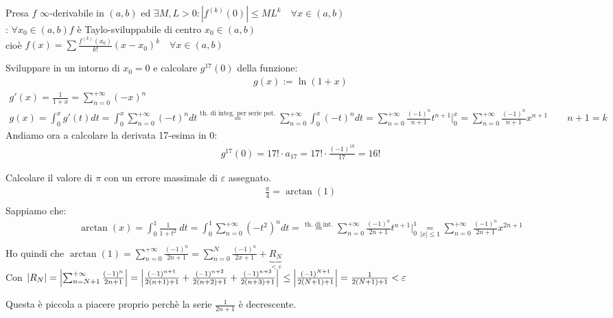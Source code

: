 \documentclass[a4paper, oneside]{article}
\begin{document}
\begin{theorem}
  Presa $f$ $\infty$-derivabile in $(a,b)$ ed $\exists M,L > 0: |f^{(k)}(0)| \leq M L^k \quad \forall x \in (a,b)$\\
  : $\forall x_0 \in (a,b) f$ è Taylo-sviluppabile di centro $x_0 \in (a,b)$\\
  cioè $f(x) = \sum \frac{f^{(k)}(x_0)}{k!} (x-x_0)^k \quad \forall x \in (a,b)$
\end{theorem}
\begin{example}
  Sviluppare in un intorno di $x_0 = 0$ e calcolare $g^{17}(0)$ della funzione:
  \begin{gather*}
    g(x) := \ln(1+x)
  \end{gather*}
  \begin{gather*}
    g'(x) = \frac{1}{1+x} = \sum_{n=0}^{+\infty} (-x)^n\\
    g(x) = \int_0^x g'(t) dt = \int_0^x \sum_{n=0}^{+\infty} (-t)^n dt \overset{\text{th. di integ. per serie pot.}}{=} \sum_{n=0}^{+\infty} \int_0^x (-t)^n dt = \sum_{n=0}^{+\infty} \frac{(-1)^n}{n+1} t^{n+1} \big\rvert_0^x = \sum_{n=0}^{+\infty} \frac{(-1)^n}{n+1} x^{n+1} \qquad n+1 = k
  \end{gather*}
  Andiamo ora a calcolare la derivata 17-esima in 0:
  \begin{gather*}
    g^{17}(0) = 17! \cdot a_{17} = 17! \cdot \frac{(-1)^{18}}{17} = 16!
  \end{gather*}
\end{example}

\begin{example}
  Calcolare il valore di $\pi$ con un errore massimale di $\varepsilon$ assegnato.\\
  \begin{gather*}
    \frac{\pi}{4} = \arctan(1)\\
  \end{gather*}
  Sappiamo che:
  \begin{gather*}
    \arctan(x) = \int_0^1 \frac{1}{1+t^2} \ dt = \int_0^1 \sum_{n=0}^{+\infty} (-t^2)^n dt = \overset{\text{th. di int.}}{=}  \sum_{n=0}^{+\infty} \frac{(-1)^n}{2n+1} t^{n+1} \big\rvert_0^1 \underset{|x| \leq 1}{ = } \sum_{n=0}^{+\infty} \frac{(-1)^n}{2n+1} x^{2n+1}\\
  \end{gather*}
  Ho quindi che $\arctan(1) = \sum_{n=0}^{+\infty} \frac{(-1)^n}{2n+1} = \sum_{n=0}^{N} \frac{(-1)^n}{2x+1} + \underbrace{R_N}_{< \varepsilon}$\\
  Con $|R_N| = \left\lvert \sum_{n=N+1}^{+\infty} \frac{(-1)^n}{2n+1} \right\rvert = \left\lvert \frac{(-1)^{n+1}}{2(n+1)+1} + \frac{(-1)^{n+2}}{2(n+2)+1} + \frac{(-1)^{n+3}}{2(n+3)+1} \right\rvert \\
  \leq \left\lvert \frac{(-1)^{N+1}}{2(N+1)+1} \right\rvert = \frac{1}{2(N+1)+1} < \varepsilon$\\
\end{example}
Questa è piccola a piacere proprio perchè la serie $\frac{1}{2n+1}$ è decrescente.
\end{document}
